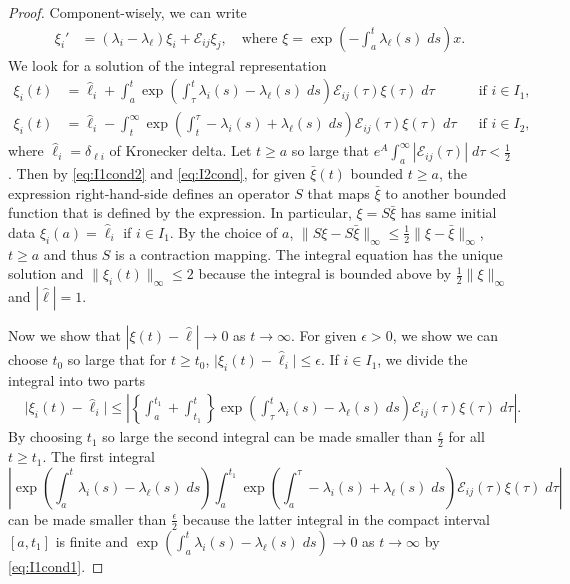 \documentclass[a4paper,11pt]{article}
\theoremstyle{remark}
\begin{document}
\begin{proof}
Component-wisely, we can write
\begin{align*}
 \xi_i' & = (\lambda_i-\lambda_\ell)\xi_i + \mathcal{E}_{ij}\xi_j, \quad \text{where $\xi = \exp\left(-\int_a^t \lambda_\ell(s) \; ds\right)x$.}
\end{align*}
We look for a solution of the integral representation
\begin{align*}
 \xi_i(t) &= \hat\ell_i + \int_a^t \exp\left(\int_\tau^t \lambda_i(s)-\lambda_\ell(s) \; ds\right)\mathcal{E}_{ij}(\tau)\xi(\tau) \; d\tau && \text{if $i\in I_1$,}\\
 \xi_i(t) &= \hat\ell_i -\int_t^\infty \exp\left(\int_t^\tau -\lambda_i(s)+\lambda_\ell(s) \; ds\right)\mathcal{E}_{ij}(\tau)\xi(\tau) \; d\tau && \text{if $i\in I_2$,}
\end{align*}
where $\hat{\ell}_i = \delta_{\ell i}$ of Kronecker delta. Let $t\ge a$ so large that $e^A\int_a^\infty |\mathcal{E}_{ij}(\tau)|\; d\tau < \frac{1}{2}$. Then by \eqref{eq:I1cond2} and \eqref{eq:I2cond}, for given $\bar\xi(t)$ bounded $t\ge a$, the expression right-hand-side defines an operator $S$ that maps $\bar\xi$ to another bounded function that is defined by the expression. In particular, $\xi=S\bar\xi$ has same initial data $\xi_i(a) = \hat{\ell}_i$ if $i\in I_1$.
By the choice of $a$, $\|S\xi - S\bar\xi\|_\infty \le \frac{1}{2}\|\xi-\bar\xi\|_\infty$, $t\ge a$ and thus $S$ is a contraction mapping. The integral equation has the unique solution and $\|\xi_i(t)\|_\infty \le 2$ because the integral is bounded above by $ \frac{1}{2} \|\xi\|_\infty$ and $|\hat{\ell}|=1$.

Now we show that $|\xi(t)-\hat\ell| \rightarrow 0$ as $t \rightarrow \infty$. For given $\epsilon>0$, we show we can choose $t_0$ so large that for $t\ge t_0$, $\big|\xi_i(t)-\hat{\ell}_i\big| \le \epsilon$. If $i\in I_1$, we divide the integral into two parts
\begin{align*}
 &\big|\xi_i(t)-\hat{\ell}_i\big| \le \left|\left\{ \int_a^{t_1} + \int_{t_1}^t \right\} \exp\left(\int_\tau^t \lambda_i(s)-\lambda_\ell(s) \; ds\right)\mathcal{E}_{ij}(\tau)\xi(\tau) \; d\tau \right|.
\end{align*}
By choosing $t_1$ so large the second integral can be made smaller than $ \frac{\epsilon}{2}$ for all $t\ge t_1$. The first integral $$\left|\exp\left(\int_a^t \lambda_i(s)-\lambda_\ell(s) \; ds\right)\int_a^{t_1} \exp\left(\int_a^\tau -\lambda_i(s)+\lambda_\ell(s) \; ds\right)\mathcal{E}_{ij}(\tau)\xi(\tau) \; d\tau \right|$$
can be made smaller than $ \frac{\epsilon}{2}$ because the latter integral in the compact interval $[a, t_1]$ is finite and $\exp\left(\int_a^t \lambda_i(s)-\lambda_\ell(s) \; ds\right) \rightarrow 0$ as $t \rightarrow \infty$ by \eqref{eq:I1cond1}.


\end{proof}
\end{document}
